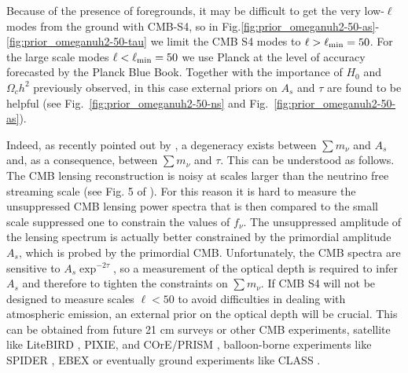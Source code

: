\documentclass[aps,prd,reprint,superscriptaddress,nofootinbib]{revtex4-1}
\newcommand{\reffig}[1]{Fig.~\ref{fig:#1}}
\begin{document}


Because of the presence of foregrounds, it may be difficult to get the very low-$\ell$ modes from the ground with CMB-S4, so in Fig.\ref{fig:prior_omeganuh2-50-as}-\ref{fig:prior_omeganuh2-50-tau} we limit the CMB S4 modes to $\ell>\ell_{\rm min}=50$. For the large scale modes $\ell<\ell_{\rm min}=50$ we use Planck at the level of accuracy forecasted by the Planck Blue Book.  
Together with the importance of $H_{0}$ and $\Omega_ch^2$ previously observed, in this case external priors on $A_{s}$ and $\tau$ are found to be helpful (see \reffig{prior_omeganuh2-50-ns} and \reffig{prior_omeganuh2-50-as}).

Indeed, as recently pointed out by \cite{allison:2015}, a degeneracy exists between $\sum m_\nu$ and $A_{s}$ and, as a consequence, between $\sum m_\nu$ and $\tau$. This can be understood as follows.
The CMB lensing reconstruction is noisy at scales larger than the neutrino free streaming scale (see Fig. 5 of \cite{2013arXiv1309.5383A}). For this reason it is hard to measure the unsuppressed CMB lensing power spectra that is then compared to the small scale suppressed one to constrain the values of $f_{\nu}$. The unsuppressed amplitude of the lensing spectrum is actually better constrained by the primordial amplitude $A_{s}$, which is probed by the primordial CMB. Unfortunately, the CMB spectra are sensitive to $A_{s}\exp^{-2\tau}$, so a measurement of the optical depth is required to infer $A_{s}$ and therefore to tighten the constraints on $\sum m_\nu$. If CMB S4 will not be designed to measure scales $\ell<50$ to avoid difficulties in dealing with atmospheric emission, an external prior on the optical depth will be crucial. This can be obtained from future 21 cm surveys \cite{liu:2015} or other CMB experiments, satellite like LiteBIRD \cite{matsumura:2014}, PIXIE\cite{kogut:2011}, and COrE/PRISM \cite{the-core-collaboration:2011,prism-collaboration:2013}, balloon-borne experiments like SPIDER \cite{filippini:2010}, EBEX \cite{reichborn-kjennerud:2010} or eventually ground experiments like CLASS \cite{essinger-hileman:2014}.
\end{document}
